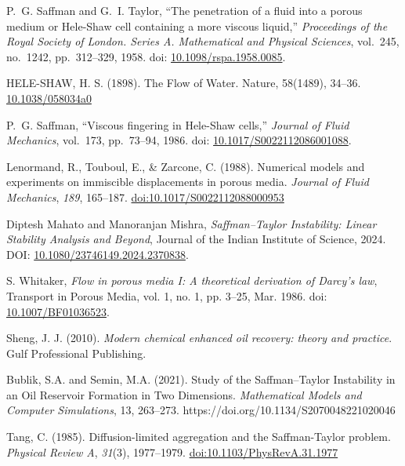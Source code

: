 \documentclass[12pt,a4paper]{article}
\begin{document}
\newpage
\begin{thebibliography}{09}
P.~G. Saffman and G.~I. Taylor,
``The penetration of a fluid into a porous medium or Hele-Shaw cell containing a more viscous liquid,''
\emph{Proceedings of the Royal Society of London. Series A. Mathematical and Physical Sciences}, vol.~245, no.~1242, pp.~312--329, 1958. doi: \href{https://doi.org/10.1098/rspa.1958.0085}{10.1098/rspa.1958.0085}.

HELE-SHAW, H. S. (1898). The Flow of Water. Nature, 58(1489), 34–36. \href{https://doi.org/10.1038/058034a0}{10.1038/058034a0}

P.~G. Saffman, ``Viscous fingering in Hele-Shaw cells,'' \emph{Journal of Fluid Mechanics}, vol.~173, pp.~73--94, 1986. doi: \href{https://doi.org/10.1017/S0022112086001088}{10.1017/S0022112086001088}.

Lenormand, R., Touboul, E., \& Zarcone, C. (1988). Numerical models and experiments on immiscible displacements in porous media. \textit{Journal of Fluid Mechanics}, \textit{189}, 165--187. \href{https://doi.org/10.1017/S0022112088000953}{doi:10.1017/S0022112088000953}



Diptesh Mahato and Manoranjan Mishra,
\textit{Saffman--Taylor Instability: Linear Stability Analysis and Beyond},
Journal of the Indian Institute of Science, 2024. 
DOI: \href{https://doi.org/10.1080/23746149.2024.2370838}{10.1080/23746149.2024.2370838}.

S. Whitaker,
\emph{Flow in porous media I: A theoretical derivation of Darcy’s law},
Transport in Porous Media, vol. 1, no. 1, pp. 3–25, Mar. 1986.
doi: \href{https://doi.org/10.1007/BF01036523}{10.1007/BF01036523}.

Sheng, J. J. (2010). \textit{Modern chemical enhanced oil recovery: theory and practice}. Gulf Professional Publishing.

Bublik, S.A. and Semin, M.A. (2021). Study of the Saffman–Taylor Instability in an Oil Reservoir Formation in Two Dimensions. \textit{Mathematical Models and Computer Simulations}, 13, 263–273. https://doi.org/10.1134/S2070048221020046


Tang, C. (1985). Diffusion-limited aggregation and the Saffman-Taylor problem. \textit{Physical Review A}, \textit{31}(3), 1977--1979. \href{https://doi.org/10.1103/PhysRevA.31.1977}{doi:10.1103/PhysRevA.31.1977}


\end{thebibliography}
\end{document}
